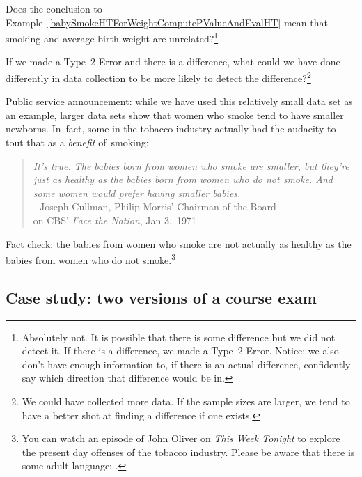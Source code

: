 {\begin{exercise}
Does the conclusion to Example~\ref{babySmokeHTForWeightComputePValueAndEvalHT} mean that smoking and average birth weight are unrelated?\footnote{Absolutely not. It is possible that there is some difference but we did not detect it. If there is a difference, we made a Type~2 Error. Notice: we also don't have enough information to, if there is an actual difference, confidently say which direction that difference would be in.}
\end{exercise}

\begin{exercise} \label{babySmokeHTIDingHowToDetectDifferences}
If we made a Type~2 Error and there is a difference, what could we have done differently in data collection to be more likely to detect the difference?\footnote{We could have collected more data. If the sample sizes are larger, we tend to have a better shot at finding a difference if one exists.}
\end{exercise}

\textC{\newpage}

Public service announcement: while we have used this relatively small data set as an example, larger data sets show that women who smoke tend to have smaller newborns. In~fact, some in the tobacco industry actually had the audacity to tout that as a \emph{benefit} of~smoking:
\begin{quotation}
\noindent\emph{It's true. The babies born from women who smoke are smaller, but they're just as healthy as the babies born from women who do not smoke. And some women would prefer having smaller babies.} \\[2mm]
\indent\indent\indent\indent\indent\indent- Joseph Cullman, Philip Morris' Chairman of the Board \\
\indent\indent\indent\indent\indent{}on CBS' \emph{Face the Nation}, Jan 3,~1971
\end{quotation}
Fact check: the babies from women who smoke are not actually as healthy as the babies from women who do not smoke.\footnote{You can watch an episode of John Oliver on \emph{This Week Tonight} to explore the present day offenses of the tobacco industry. Please be aware that there is some adult language: .}



\subsection{Case study: two versions of a course exam}

}
